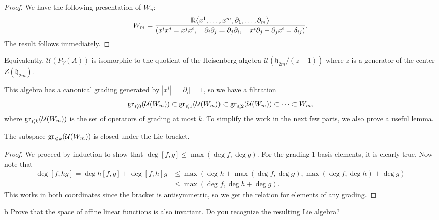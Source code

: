 \documentclass{pset}
\begin{document}
\begin{parts}
    \begin{proof}
        We have the following presentation of $W_n$:
        \[
            W_m = \frac{\mathbb{R}\big\langle x^1,\ldots,x^m,\partial_1,\ldots,\partial_m \big\rangle}{(x^ix^j=x^jx^i,\quad \partial_i\partial_j=\partial_j\partial_i,\quad x^i\partial_j-\partial_jx^i = \delta_{ij})}
        .\] 
        The result follows immediately.
    \end{proof}

    \begin{claim}

    Equivalently, $\mathcal{U}(P_V(A))$ is isomorphic to the quotient of the Heisenberg algebra $\mathcal{U}(\mathfrak{h}_{2m} / (z-1))$ where $z$ is a generator of the center $Z(\mathfrak{h}_{2m})$.
    \end{claim}

    This algebra has a canonical grading generated by $|x^i|=|\partial_i| = 1$, so we have a filtration
    \[
        \mathrm{gr}_{\leqslant 0}(\mathcal{U}(W_m)) \subset \mathrm{gr}_{\leqslant 1}(\mathcal{U}(W_m)) \subset \mathrm{gr}_{\leqslant 2}(\mathcal{U}(W_m)) \subset \cdots \subset W_m,
    \] 
    where $\mathrm{gr}_{\leqslant k}(\mathcal{U}(W_m))$ is the set of operators of grading at most $k$. To simplify the work in the next few parts, we also prove a useful lemma.

    \begin{claim}
        The subspace $\mathrm{gr}_{\leqslant k}(\mathcal{U}(W_m))$ is closed under the Lie bracket.
    \end{claim}

    \begin{proof}
        We proceed by induction to show that $\deg [f,g] \leq \max(\deg f, \deg g)$. For the grading 1 basis elements, it is clearly true. Now note that
        \[
            \begin{aligned}
                \deg[f,hg] = \deg h[f,g] + \deg [f,h]g &\leq \max(\deg h + \max(\deg f, \deg g), \max(\deg f, \deg h) + \deg g)\\ &\leq \max(\deg f, \deg h + \deg g).
            \end{aligned}
        \]
        This works in both coordinates since the bracket is antisymmetric, so we get the relation for elements of any grading.
    \end{proof}

    \begin{part}{b}
        Prove that the space of affine linear functions is also invariant. Do you recognize the resulting Lie algebra?
    \end{part}


\end{parts}
\end{document}
